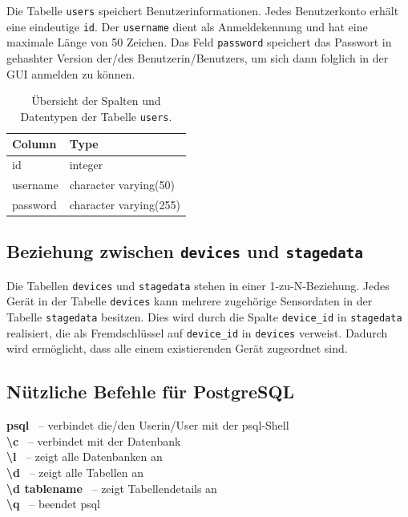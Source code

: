 Die Tabelle \texttt{users} speichert Benutzerinformationen. Jedes Benutzerkonto erhält eine eindeutige \texttt{id}. Der \texttt{username} dient als Anmeldekennung und hat eine maximale Länge von 50 Zeichen. Das Feld \texttt{password} speichert das Passwort in gehashter Version der/des Benutzerin/Benutzers, um sich dann folglich in der GUI anmelden zu können.
\begin{table}[H]
	\centering
	\begin{tabular}{|l|l|}
		\hline
		\textbf{Column} & \textbf{Type} \\
		\hline
		id & integer \\
		\hline
		username & character varying(50) \\
		\hline
		password & character varying(255) \\
		\hline
	\end{tabular}
	\caption{Übersicht der Spalten und Datentypen der Tabelle \texttt{users}.}
	\label{tab:users}
\end{table}

\subsection{Beziehung zwischen \texttt{devices} und \texttt{stagedata}}

Die Tabellen \texttt{devices} und \texttt{stagedata} stehen in einer 1-zu-N-Beziehung. Jedes Gerät in der Tabelle \texttt{devices} kann mehrere zugehörige Sensordaten in der Tabelle \texttt{stagedata} besitzen. Dies wird durch die Spalte \texttt{device\_id} in \texttt{stagedata} realisiert, die als Fremdschlüssel auf \texttt{device\_id} in \texttt{devices} verweist. Dadurch wird ermöglicht, dass alle einem existierenden Gerät zugeordnet sind. 

\subsection{Nützliche Befehle für PostgreSQL}
\textbf{psql} \ – verbindet die/den Userin/User mit der psql-Shell \\
\textbf{\textbackslash{c}} \ – verbindet mit der Datenbank \\
\textbf{\textbackslash{l}} \ – zeigt alle Datenbanken an \\
\textbf{\textbackslash{d}} \ – zeigt alle Tabellen an \\
\textbf{\textbackslash{d} tablename} \ – zeigt Tabellendetails an \\
\textbf{\textbackslash{q}} \ – beendet psql

